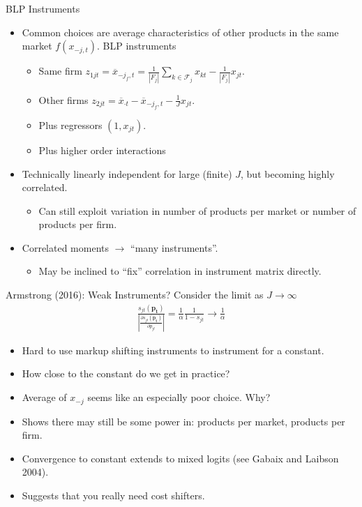 \documentclass[xcolor=pdftex,dvipsnames,table,mathserif,aspectratio=169]{beamer}
\begin{document}
\begin{frame}{BLP Instruments}
\begin{itemize}
\item Common choices are average characteristics of other products in the same market $f(x_{-j,t})$. \alert{BLP instruments}
\begin{itemize}
\item Same firm $z_{1jt} = \overline{x}_{-j_f,t} = \frac{1}{\left\vert{F_j}\right\vert}  \sum_{k \in \mathcal{F}_j} x_{kt} - \frac{1}{\left\vert{F_j}\right\vert} x_{jt}$.
\item Other firms $z_{2jt}=\overline{x}_{\cdot t} - \overline{x}_{-j_f,t} - \frac{1}{J} x_{jt}$.
\item Plus regressors $(1, x_{jt})$.
\item Plus higher order interactions 
\end{itemize}
\item Technically linearly independent for large (finite) $J$, but becoming highly correlated.
\begin{itemize}
\item Can still exploit variation in number of products per market or number of products per firm.
\end{itemize}
\item Correlated moments $\rightarrow$ ``many instruments''.
\begin{itemize}
\item May be inclined to ``fix'' correlation in instrument matrix directly.
\end{itemize}
\end{itemize}
\end{frame}


\begin{frame}{Armstrong (2016): Weak Instruments?}
Consider the limit as $J \rightarrow \infty$
\begin{eqnarray*}
\frac{s_{jt}(\mathbf{p_t})}{\left|\frac{\partial s_{jt}(\mathbf{p_t})}{\partial p_{jt}}\right|} = \frac{1}{\alpha} \frac{1}{1-s_{jt}} \rightarrow \frac{1}{\alpha}
\end{eqnarray*}
\begin{itemize}
\item Hard to use markup shifting instruments to instrument for a constant.
\item How close to the constant do we get in practice?
\item Average of $x_{-j}$ seems like an especially poor choice. Why?
\item Shows there may still be some power in: products per market, products per firm.
\item Convergence to constant extends to mixed logits (see Gabaix and Laibson 2004).
\item Suggests that you really need cost shifters.
\end{itemize}
\end{frame}
\end{document}
